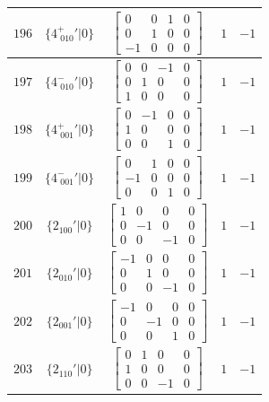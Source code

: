 \documentclass[fleqn,8pt]{jsarticle}
\begin{document}
\begin{longtable}{ccccc}
$ 196 $ & $ \{4^{+}_{\,\,010}{}'|0\} $ & $ \begin{bmatrix} 0 & 0 & 1 & 0 \\ 0 & 1 & 0 & 0 \\ -1 & 0 & 0 & 0 \end{bmatrix} $ & $ 1 $ & $ -1 $ \\ \hline
$ 197 $ & $ \{4^{-}_{\,\,010}{}'|0\} $ & $ \begin{bmatrix} 0 & 0 & -1 & 0 \\ 0 & 1 & 0 & 0 \\ 1 & 0 & 0 & 0 \end{bmatrix} $ & $ 1 $ & $ -1 $ \\ \hline
$ 198 $ & $ \{4^{+}_{\,\,001}{}'|0\} $ & $ \begin{bmatrix} 0 & -1 & 0 & 0 \\ 1 & 0 & 0 & 0 \\ 0 & 0 & 1 & 0 \end{bmatrix} $ & $ 1 $ & $ -1 $ \\ \hline
$ 199 $ & $ \{4^{-}_{\,\,001}{}'|0\} $ & $ \begin{bmatrix} 0 & 1 & 0 & 0 \\ -1 & 0 & 0 & 0 \\ 0 & 0 & 1 & 0 \end{bmatrix} $ & $ 1 $ & $ -1 $ \\ \hline
$ 200 $ & $ \{2{}_{100}{}'|0\} $ & $ \begin{bmatrix} 1 & 0 & 0 & 0 \\ 0 & -1 & 0 & 0 \\ 0 & 0 & -1 & 0 \end{bmatrix} $ & $ 1 $ & $ -1 $ \\ \hline
$ 201 $ & $ \{2{}_{010}{}'|0\} $ & $ \begin{bmatrix} -1 & 0 & 0 & 0 \\ 0 & 1 & 0 & 0 \\ 0 & 0 & -1 & 0 \end{bmatrix} $ & $ 1 $ & $ -1 $ \\ \hline
$ 202 $ & $ \{2{}_{001}{}'|0\} $ & $ \begin{bmatrix} -1 & 0 & 0 & 0 \\ 0 & -1 & 0 & 0 \\ 0 & 0 & 1 & 0 \end{bmatrix} $ & $ 1 $ & $ -1 $ \\ \hline
$ 203 $ & $ \{2{}_{110}{}'|0\} $ & $ \begin{bmatrix} 0 & 1 & 0 & 0 \\ 1 & 0 & 0 & 0 \\ 0 & 0 & -1 & 0 \end{bmatrix} $ & $ 1 $ & $ -1 $ \\ \hline

\end{longtable}
\end{document}
